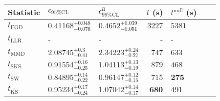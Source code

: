 \begin{tabular}{l|llr|llr}
	Statistic & $\epsilon_{95\%\mathrm{CL}}$ & $\epsilon^    {\mathcal{U}}_{99\%\mathrm{CL}}$ & $t$ (s) & $t^{\mathrm{null}}$ (s) \\
	\midrule
	$t_{\mathrm{FGD}}$ & ${\mathbf{0.41168_{-0.076}^{+0.048}}}$ & ${\mathbf{0.4652_{-0.051}^{+0.039}}}$ & $3227$ & $5381$ \\
	$t_{\mathrm{LLR}}$ & - & - & - & - \\
	$t_{\mathrm{MMD}}$ & $2.08745_{-0.41}^{+0.3}$ & $2.34223_{-0.27}^{+0.24}$ & $747$ & $633$ \\
	$t_{\mathrm{SKS}}$ & $0.91554_{-0.25}^{+0.16}$ & $1.04113_{-0.19}^{+0.13}$ & $879$ & $468$ \\
	$t_{\mathrm{SW}}$ & $0.84895_{-0.22}^{+0.14}$ & $0.96147_{-0.15}^{+0.12}$ & $715$ & ${\mathbf{275}}$ \\
	$t_{\overline{\mathrm{KS}}}$ & $0.95234_{-0.24}^{+0.17}$ & $1.07042_{-0.17}^{+0.14}$ & ${\mathbf{680}}$ & $491$ \\
	\bottomrule
\end{tabular}
